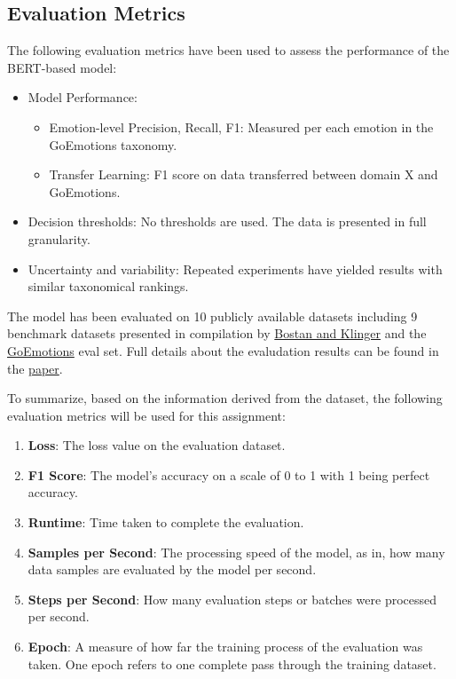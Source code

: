 \documentclass[titlepage]{article}
\begin{document}
\subsection{Evaluation Metrics}
The following evaluation metrics have been used to assess the performance of the BERT-based model:
\begin{itemize}
    \item Model Performance:
        \begin{itemize}
            \item Emotion-level Precision, Recall, F1: Measured per each emotion in the GoEmotions taxonomy.
            \item Transfer Learning: F1 score on data transferred between domain X and GoEmotions.
        \end{itemize}
    \item Decision thresholds: No thresholds are used. The data is presented in full granularity.
    \item Uncertainty and variability: Repeated experiments have yielded results with similar taxonomical rankings.
\end{itemize}

The model has been evaluated on 10 publicly available datasets including 9 benchmark datasets presented in compilation 
by \href{https://aclanthology.org/C18-1179/}{Bostan and Klinger} and the \href{https://github.com/google-research/google-research/tree/master/goemotions}
{GoEmotions} eval set. Full details about the evaludation results can be found in the \href{https://arxiv.org/pdf/2005.00547}{paper}.

To summarize, based on the information derived from the dataset, the following evaluation metrics will be used for this assignment:
\begin{enumerate}
    \item \textbf{Loss}: The loss value on the evaluation dataset. 
    \item \textbf{F1 Score}: The model's accuracy on a scale of 0 to 1 with 1 being perfect accuracy.
    \item \textbf{Runtime}: Time taken to complete the evaluation.
    \item \textbf{Samples per Second}: The processing speed of the model, as in, how many data samples are evaluated by the model per second.
    \item \textbf{Steps per Second}: How many evaluation steps or batches were processed per second.
    \item \textbf{Epoch}: A measure of how far the training process of the evaluation was taken. One epoch refers to one complete 
    pass through the training dataset.
\end{enumerate}
\end{document}
